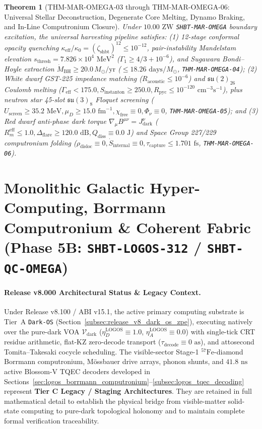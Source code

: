 \documentclass[11pt,onecolumn]{article}
\newtheorem{theorem}{Theorem}
\begin{document}
\begin{theorem}[THM-MAR-OMEGA-03 through THM-MAR-OMEGA-06: Universal Stellar Deconstruction, Degenerate Core Melting, Dynamo Braking, and In-Line Computronium Closure]
\label{thm:mar_omega_03_06}
Under $10.00\text{ ZW}$ \texttt{SHBT-MAR-OMEGA} boundary excitation, the universal harvesting pipeline satisfies: (1) 12-stage conformal opacity quenching $\kappa_{\text{eff}}/\kappa_0 = (\zeta_{\text{shbt}})^{12} \le 10^{-12}$, pair-instability Mandelstam elevation $s_{\text{thresh}} = 7.826 \times 10^4\text{ MeV}^2$ ($\Gamma_1 \ge 4/3 + 10^{-6}$), and Sugawara Bondi--Hoyle extraction $\dot{M}_{\text{BH}} \ge 20.0\,M_\odot/\text{yr}$ ($\le 18.26\text{ days}/M_\odot$, \texttt{THM-MAR-OMEGA-04}); (2) White dwarf GST-225 impedance matching ($R_{\text{acoustic}} \le 10^{-6}$) and $\mathfrak{su}(2)_{26}$ Coulomb melting ($\Gamma_{\text{eff}} < 175.0, S_{\text{instanton}} \ge 250.0, R_{\text{pyc}} \le 10^{-120}\text{ cm}^{-3}\text{s}^{-1}$), plus neutron star 45-slot $\mathfrak{su}(3)_8$ Floquet screening ($U_{\text{screen}} \ge 35.2\text{ MeV}, \mu_D \ge 15.0\text{ fm}^{-1}, \chi_{\text{free}} \equiv 0, \Phi_\nu \equiv 0$, \texttt{THM-MAR-OMEGA-05}); and (3) Red dwarf anti-phase dark torque $\nabla_\mu B^{\mu\nu} = J_{\text{dark}}^\nu$ ($R_m^{\text{eff}} \le 1.0, \Delta_{\text{flare}} \ge 120.0\text{ dB}, Q_{\text{diss}} \equiv 0.0\text{ J}$) and Space Group 227/229 computronium folding ($\rho_{\text{disloc}} \equiv 0, \dot{S}_{\text{internal}} \equiv 0, \tau_{\text{capture}} \le 1.701\text{ fs}$, \texttt{THM-MAR-OMEGA-06}).
\end{theorem}
\FloatBarrier

\section{Monolithic Galactic Hyper-Computing, Borrmann Computronium \& Coherent Fabric (Phase 5B: \texttt{SHBT-LOGOS-312} / \texttt{SHBT-QC-OMEGA})}
\paragraph{Release v8.000 Architectural Status \& Legacy Context.}
Under Release v8.100 / ABI v15.1, the active primary computing substrate is Tier~A \texttt{Dark-OS} (Section~\ref{subsec:release_v8_dark_os_zpe}), executing natively over the pure-dark VOA $\mathcal{V}_{\text{dark}}$ ($\eta_D^{\text{LOGOS}}\equiv1.0$, $\eta_A^{\text{LOGOS}}\equiv0.0$) with single-tick CRT residue arithmetic, flat-KZ zero-decode transport ($\tau_{\text{decode}}\equiv0\text{ as}$), and attosecond Tomita--Takesaki cocycle scheduling. The visible-sector Stage-1 $^{57}\text{Fe}$-diamond Borrmann computronium, M\"ossbauer drive arrays, phonon shunts, and $41.8\text{ ns}$ active Blossom-V TQEC decoders developed in Sections~\ref{sec:logos_borrmann_computronium}--\ref{subsec:logos_tqec_decoding} represent \textbf{Tier C Legacy / Staging Architectures}. They are retained in full mathematical detail to establish the physical bridge from visible-matter solid-state computing to pure-dark topological holonomy and to maintain complete formal verification traceability.
\end{document}
